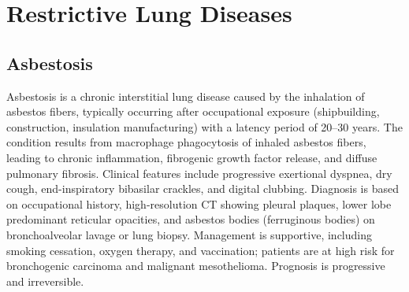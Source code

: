 \section{Restrictive Lung Diseases}








\label{sec:Restrictive Lung Diseases}

\subsection{Asbestosis}
\label{sec:Asbestosis}
Asbestosis is a chronic interstitial lung disease caused by the inhalation of asbestos fibers, typically occurring after occupational exposure (shipbuilding, construction, insulation manufacturing) with a latency period of 20--30 years. The condition results from macrophage phagocytosis of inhaled asbestos fibers, leading to chronic inflammation, fibrogenic growth factor release, and diffuse pulmonary fibrosis. Clinical features include progressive exertional dyspnea, dry cough, end-inspiratory bibasilar crackles, and digital clubbing. Diagnosis is based on occupational history, high-resolution CT showing pleural plaques, lower lobe predominant reticular opacities, and asbestos bodies (ferruginous bodies) on bronchoalveolar lavage or lung biopsy. Management is supportive, including smoking cessation, oxygen therapy, and vaccination; patients are at high risk for bronchogenic carcinoma and malignant mesothelioma. Prognosis is progressive and irreversible.

